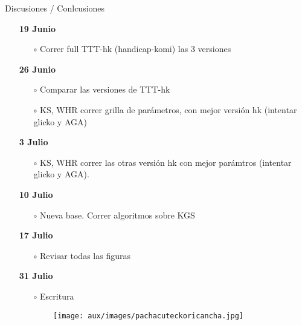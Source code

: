 \documentclass[shownotes,aspectratio=169]{beamer}
\begin{document}
\begin{frame}[plain]
 \centering
 \LARGE Discusiones / Conlcusiones
 
\end{frame}

\begin{frame}[plain]
 
 \begin{itemize}
  \item[\textbf{19 Junio}]
  \begin{itemize}
   \item[$\circ$] Correr full TTT-hk (handicap-komi) las 3 versiones
  \end{itemize}
  
  \item[\textbf{26 Junio}] 
  \begin{itemize}
   \item[$\circ$] Comparar las versiones de TTT-hk
   \item[$\circ$] KS, WHR correr grilla de par\'ametros, con mejor versi\'on hk (intentar glicko y AGA)
  \end{itemize}
  
  \item[\textbf{3 Julio}]
  \begin{itemize}
   \item[$\circ$] KS, WHR correr las otras versi\'on hk con mejor par\'amtros (intentar glicko y AGA).
   \end{itemize}
  
  \item[\textbf{10 Julio}] 
  \begin{itemize}
   \item[$\circ$] Nueva base. Correr algoritmos sobre KGS 
  \end{itemize}
  
  \item[\textbf{17 Julio}] 
  \begin{itemize}
   \item[$\circ$] Revisar todas las figuras 
  \end{itemize}
  
  \item[\textbf{31 Julio}]
  \begin{itemize}
   \item[$\circ$] Escritura
  \end{itemize}
 \end{itemize}
 
\end{frame}


\begin{frame}[plain]
 
 \begin{figure}[H]     
     \centering
     \begin{subfigure}[b]{0.33\textwidth}
       \texttt{[image: aux/images/pachacuteckoricancha.jpg]} 
     \end{subfigure}
   \end{figure} 
  
\end{frame}
\end{document}
